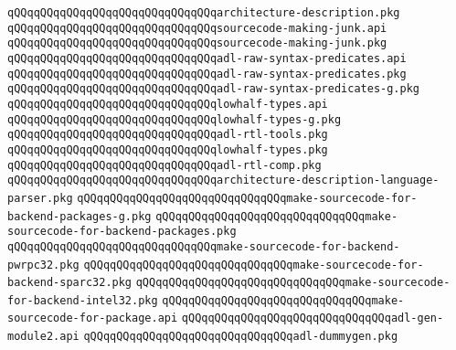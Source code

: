 \verb|qQQqqQQqqQQqqQQqqQQqqQQqqQQqqQQqarchitecture-description.pkg|\newline
\newline
\verb|qQQqqQQqqQQqqQQqqQQqqQQqqQQqqQQqsourcecode-making-junk.api|\newline
\verb|qQQqqQQqqQQqqQQqqQQqqQQqqQQqqQQqsourcecode-making-junk.pkg|\newline
\newline
\verb|qQQqqQQqqQQqqQQqqQQqqQQqqQQqqQQqadl-raw-syntax-predicates.api|\newline
\verb|qQQqqQQqqQQqqQQqqQQqqQQqqQQqqQQqadl-raw-syntax-predicates.pkg|\newline
\verb|qQQqqQQqqQQqqQQqqQQqqQQqqQQqqQQqadl-raw-syntax-predicates-g.pkg|\newline
\verb|qQQqqQQqqQQqqQQqqQQqqQQqqQQqqQQqlowhalf-types.api|\newline
\verb|qQQqqQQqqQQqqQQqqQQqqQQqqQQqqQQqlowhalf-types-g.pkg|\newline
\newline
\verb|qQQqqQQqqQQqqQQqqQQqqQQqqQQqqQQqadl-rtl-tools.pkg|\newline
\verb|qQQqqQQqqQQqqQQqqQQqqQQqqQQqqQQqlowhalf-types.pkg|\newline
\verb|qQQqqQQqqQQqqQQqqQQqqQQqqQQqqQQqadl-rtl-comp.pkg|\newline
\verb|qQQqqQQqqQQqqQQqqQQqqQQqqQQqqQQqarchitecture-description-language-parser.pkg|\newline
\newline
\verb|qQQqqQQqqQQqqQQqqQQqqQQqqQQqqQQqmake-sourcecode-for-backend-packages-g.pkg|\newline
\verb|qQQqqQQqqQQqqQQqqQQqqQQqqQQqqQQqmake-sourcecode-for-backend-packages.pkg|\newline
\newline
\verb|qQQqqQQqqQQqqQQqqQQqqQQqqQQqqQQqmake-sourcecode-for-backend-pwrpc32.pkg|\newline
\verb|qQQqqQQqqQQqqQQqqQQqqQQqqQQqqQQqmake-sourcecode-for-backend-sparc32.pkg|\newline
\verb|qQQqqQQqqQQqqQQqqQQqqQQqqQQqqQQqmake-sourcecode-for-backend-intel32.pkg|\newline
\newline
\verb|qQQqqQQqqQQqqQQqqQQqqQQqqQQqqQQqmake-sourcecode-for-package.api|\newline
\newline
\verb|qQQqqQQqqQQqqQQqqQQqqQQqqQQqqQQqadl-gen-module2.api|\newline
\verb|qQQqqQQqqQQqqQQqqQQqqQQqqQQqqQQqadl-dummygen.pkg|\newline
